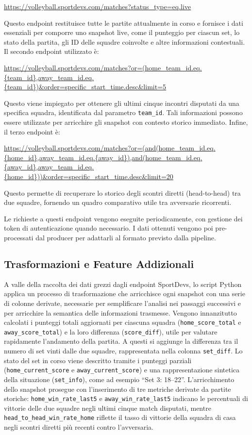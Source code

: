 \documentclass[a4paper,12pt]{report}
\begin{document}
\url{https://volleyball.sportdevs.com/matches?status_type=eq.live}

Questo endpoint restituisce tutte le partite attualmente in corso e fornisce i dati essenziali per comporre uno snapshot live, come il punteggio per ciascun set, lo stato della partita, gli ID delle squadre coinvolte e altre informazioni contestuali.
Il secondo endpoint utilizzato è:

\url{https://volleyball.sportdevs.com/matches?or=(home_team_id.eq.{team_id},away_team_id.eq.{team_id})&order=specific_start_time.desc&limit=5}

Questo viene impiegato per ottenere gli ultimi cinque incontri disputati da una specifica squadra, identificata dal parametro \texttt{team\_id}. Tali informazioni possono essere utilizzate per arricchire gli snapshot con contesto storico immediato.
Infine, il terzo endpoint è:

\url{https://volleyball.sportdevs.com/matches?or=(and(home_team_id.eq.{home_id},away_team_id.eq.{away_id}),and(home_team_id.eq.{away_id},away_team_id.eq.{home_id}))&order=specific_start_time.desc&limit=20}

Questo permette di recuperare lo storico degli scontri diretti (head-to-head) tra due squadre, fornendo un quadro comparativo utile tra avversarie ricorrenti.

Le richieste a questi endpoint vengono eseguite periodicamente, con gestione dei token di autenticazione quando necessario. I dati ottenuti vengono poi pre-processati dal producer per adattarli al formato previsto dalla pipeline.

\subsection{Trasformazioni e Feature Addizionali}

A valle della raccolta dei dati grezzi dagli endpoint SportDevs, lo script Python applica un processo di trasformazione che arricchisce ogni snapshot con una serie di colonne derivate, necessarie per semplificare l’analisi nei passaggi successivi e per arricchire la semantica delle informazioni trasmesse.
Vengono innanzitutto calcolati i punteggi totali aggiornati per ciascuna squadra (\texttt{home\_score\_total} e \texttt{away\_score\_total}) e la loro differenza (\texttt{score\_diff}), utile per valutare rapidamente l’andamento della partita. A questi si aggiunge la differenza tra il numero di set vinti dalle due squadre, rappresentata nella colonna \texttt{set\_diff}. Lo stato del set in corso viene descritto tramite i punteggi parziali (\texttt{home\_current\_score} e \texttt{away\_current\_score}) e una rappresentazione sintetica della situazione (\texttt{set\_info}), come ad esempio ``Set 3: 18--22''.
L’arricchimento dello snapshot prosegue con l’inserimento di tre metriche derivate da partite storiche: \texttt{home\_win\_rate\_last5} e \texttt{away\_win\_rate\_last5} indicano le percentuali di vittorie delle due squadre negli ultimi cinque match disputati, mentre \texttt{head\_to\_head\_win\_rate\_home} riflette il tasso di vittorie della squadra di casa negli scontri diretti più recenti contro l’avversaria.
\end{document}
